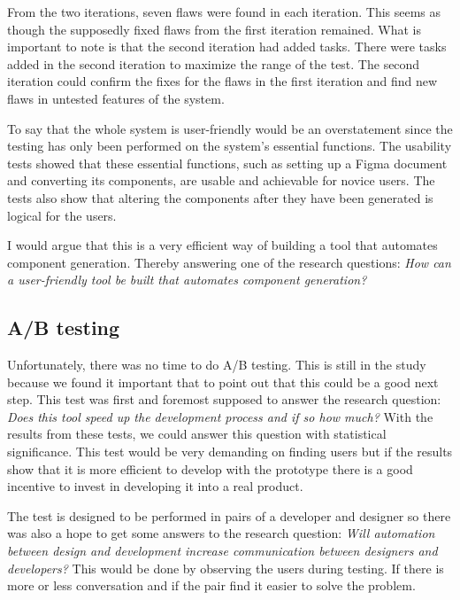 From the two iterations, seven flaws were found in each iteration. This seems as though the supposedly fixed flaws from the first iteration remained. What is important to note is that the second iteration had added tasks. There were tasks added in the second iteration to maximize the range of the test. The second iteration could confirm the fixes for the flaws in the first iteration and find new flaws in untested features of the system. 

To say that the whole system is user-friendly would be an overstatement since the testing has only been performed on the system's essential functions. The usability tests showed that these essential functions, such as setting up a Figma document and converting its components, are usable and achievable for novice users. The tests also show that altering the components after they have been generated is logical for the users. 

I would argue that this is a very efficient way of building a tool that automates component generation. Thereby answering one of the research questions: \textit{How can a user-friendly tool be built that automates component generation?}



\subsection{A/B testing}%
\label{sub:A/B testing}
Unfortunately, there was no time to do A/B testing. This is still in the study because we found it important that to point out that this could be a good next step. This test was first and foremost supposed to answer the  research question: \textit{Does this tool speed up the development process and if so how much?} With the results from these tests, we could answer this question with statistical significance. This test would be very demanding on finding users but if the results show that it is more efficient to develop with the prototype there is a good incentive to invest in developing it into a real product. 

The test is designed to be performed in pairs of a developer and designer so there was also a hope to get some answers to the research question: \textit{Will automation between design and development increase communication between designers and developers?} This would be done by observing the users during testing. If there is more or less conversation and if the pair find it easier to solve the problem.

\newpage
